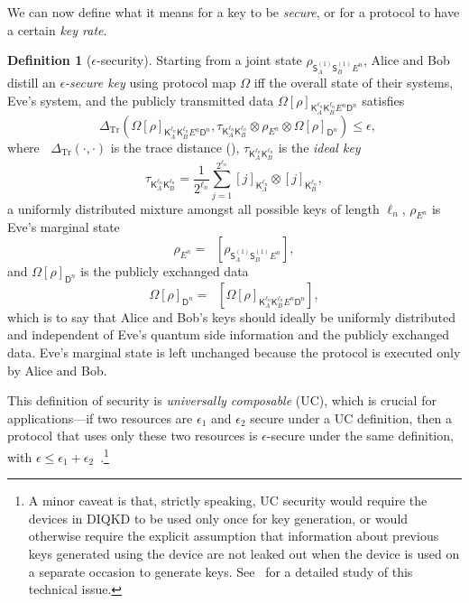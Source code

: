 \documentclass[10pt, a4paper]{article}
\numberwithin{equation}{section} %
\newcounter{stmt} %
\theoremstyle{definition}
\newtheorem{defn}[stmt]{Definition}
\theoremstyle{plain}
\newcommand{\?}{\mathrel{?}} %
\newcommand{\Tr}[2][]{\mathop{\mathrm{Tr}#1}\left[ #2 \right]} %
\newcommand{\Trdist}[2]{\mathop{}\Delta_\mathrm{Tr}\left(#1, #2\right)}
\newcommand{\crv}[1]{\mathsf{#1}}
\newcommand{\proj}[2][]{{[#2]}_{#1}}
\begin{document}
    We can now define what it means for a key to be \emph{secure}, or for a protocol to have a certain \emph{key rate}.

    \begin{defn}[\(\epsilon\)-security]
      Starting from a joint state \(\rho_{\crv{S}_A^{(1)} \crv{S}_B^{(1)} E^n}\), Alice and Bob distill an \emph{\(\epsilon\)-secure key} using protocol map \(\Omega\) iff the overall state of their systems, Eve's system, and the publicly transmitted data \({\Omega[\rho]}_{\crv{K}_{A}^{\ell_n} \crv{K}_{B}^{\ell_n} E^n \crv{D}^n}\) satisfies
      \begin{equation}
        \Trdist{{\Omega[\rho]}_{\crv{K}_{A}^{\ell_n} \crv{K}_{B}^{\ell_n} E^n \crv{D}^n}}{\tau_{\crv{K}_{A}^{\ell_n} \crv{K}_{B}^{\ell_n}} \otimes \rho_{E^n} \otimes {\Omega[\rho]}_{\crv{D}^n}} \leq \epsilon,
      \end{equation}
      where \(\Trdist{\cdot}{\cdot}\) is the trace distance (), \(\tau_{\crv{K}_{A}^{\ell_n} \crv{K}_{B}^{\ell_n}}\) is the \emph{ideal key}
      \begin{equation}
        \tau_{\crv{K}_{A}^{\ell_n} \crv{K}_{B}^{\ell_n}} = \frac{1}{2^{\ell_n}} \sum_{j=1}^{2^{\ell_n}} \proj[\crv{K}_{A}^{\ell_n}]{j} \otimes \proj[\crv{K}_{B}^{\ell_n}]{j},
      \end{equation}
      a uniformly distributed mixture amongst all possible keys of length \(\ell_n\), \(\rho_{E^n}\) is Eve's marginal state
      \begin{equation}
        \rho_{E^n} = \Tr[_{\crv{S}_A^{(1)} \crv{S}_B^{(1)}}]{ \rho_{\crv{S}_A^{(1)} \crv{S}_B^{(1)} E^n} },
      \end{equation}
      and \({\Omega[\rho]}_{\crv{D}^n}\) is the publicly exchanged data
      \begin{equation}
        {\Omega[\rho]}_{\crv{D}^n} = \Tr[_{\crv{K}_{A}^{\ell_n} \crv{K}_{B}^{\ell_n} E^n}]{ {\Omega[\rho]}_{\crv{K}_{A}^{\ell_n} \crv{K}_{B}^{\ell_n} E^n \crv{D}^n} },
      \end{equation} 
      which is to say that Alice and Bob's keys should ideally be uniformly distributed and independent of Eve's quantum side information and the publicly exchanged data. Eve's marginal state is left unchanged because the protocol is executed only by Alice and Bob.
    \end{defn}

    This definition of security is \emph{universally composable} (UC), which is crucial for applications---if two resources are \(\epsilon_1\) and \(\epsilon_2\) secure under a UC definition, then a protocol that uses only these two resources is \(\epsilon\)-secure under the same definition, with \(\epsilon \leq \epsilon_1 + \epsilon_2\)~\cite{SecurityQKD}.\footnote{A minor caveat is that, strictly speaking, UC security would require the devices in DIQKD to be used only once for key generation, or would otherwise require the explicit assumption that information about previous keys generated using the device are not leaked out when the device is used on a separate occasion to generate keys. See~\cite{SecurityQKD} for a detailed study of this technical issue.}
\end{document}
